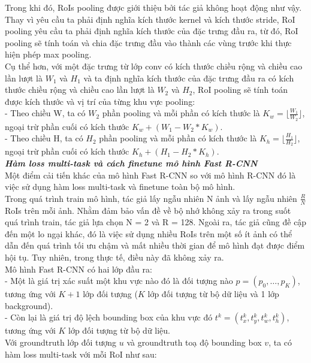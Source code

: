 {    \noindent
    Trong khi đó, RoIs pooling được giới thiệu bởi tác giả không hoạt động như vậy.
    Thay vì yêu cầu ta phải định nghĩa kích thước kernel và kích thước stride, RoI pooling yêu cầu ta phải định nghĩa kích thước của đặc trưng đầu ra, từ đó, RoI pooling sẽ tính toán và chia đặc trưng đầu vào thành các vùng trước khi thực hiện phép max pooling. \\
    Cụ thể hơn, với một đặc trưng từ lớp conv có kích thước chiều rộng và chiều cao lần lượt là ${W}_{1}$ và ${H}_{1}$ và ta định nghĩa kích thước của đặc trưng đầu ra có kích thước chiều rộng và chiều cao lần lượt là ${W}_{2}$ và ${H}_{2}$, RoI pooling sẽ tính toán được kích thước và vị trí của từng khu vực pooling: \\
    - Theo chiều W, ta có ${W}_{2}$ phần pooling và mỗi phần có kích thước là ${K}_{w} = \lfloor\frac{{W}_{1}}{{W}_{2}}\rfloor$, ngoại trừ phần cuối có kích thước ${K}_{w} + ({W}_{1} - {W}_{2} * {K}_{w})$. \\
    - Theo chiều H, ta có ${H}_{2}$ phần pooling và mỗi phần có kích thước là ${K}_{h} = \lfloor\frac{{H}_{1}}{{H}_{2}}\rfloor$, ngoại trừ phần cuối có kích thước ${K}_{h} + ({H}_{1} - {H}_{2} * {K}_{h})$. \\

    \noindent
    \textbf{\textit{Hàm loss multi-task và cách finetune mô hình Fast R-CNN}} \\
    Một điểm cải tiến khác của mô hình Fast R-CNN so với mô hình R-CNN đó là việc sử dụng hàm loss multi-task và finetune toàn bộ mô hình. \\
    Trong quá trình train mô hình, tác giả lấy ngẫu nhiên N ảnh và lấy ngẫu nhiên $\frac{R}{N}$ RoIs trên mỗi ảnh.
    Nhằm đảm bảo vấn đề về bộ nhớ không xảy ra trong suốt quá trình train, tác giả lựa chọn N = 2 và R = 128.
    Ngoài ra, tác giả cũng đề cập đến một lo ngại khác, đó là việc sử dụng nhiều RoIs trên một số ít ảnh có thể dẫn đến quá trình tối ưu chậm và mất nhiều thời gian để mô hình đạt được điểm hội tụ.
    Tuy nhiên, trong thực tế, điều này đã không xảy ra. \\
    Mô hình Fast R-CNN có hai lớp đầu ra: \\
    - Một là giá trị xác suất một khu vực nào đó là đối tượng nào $p = (p_0, \dots, p_K)$, tương ứng với $K + 1$ lớp đối tượng ($K$ lớp đối tượng từ bộ dữ liệu và 1 lớp background). \\
    - Còn lại là giá trị độ lệch bounding box của khu vực đó $t^{k} = (t^{k}_{x}, t^{k}_{y}, t^{k}_{w}, t^{k}_{h})$, tương ứng với $K$ lớp đối tượng từ bộ dữ liệu. \\
    Với groundtruth lớp đối tượng $u$ và groundtruth toạ độ bounding box $v$, ta có hàm loss multi-task với mỗi RoI như sau:

}
